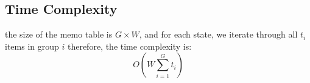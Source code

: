 \documentclass[a4paper,12pt]{article}
\begin{document}
\subsection*{Time Complexity}
the size of the memo table is $G \times W$,
and for each state, we iterate through all $t_i$ items in group $i$
therefore, the time complexity is:
\[
O\left(W \sum_{i=1}^{G} t_i\right)
\]



\end{document}
